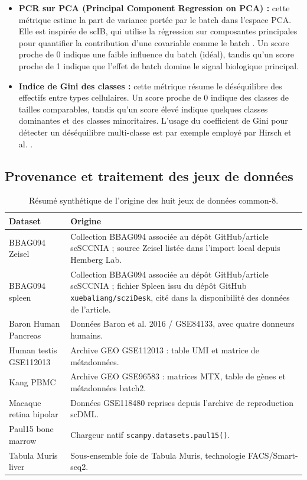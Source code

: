 \begin{itemize}
    \item \textbf{PCR sur PCA (Principal Component Regression on PCA) :} cette métrique estime la part de variance portée par le batch dans l'espace PCA. Elle est inspirée de scIB, qui utilise la régression sur composantes principales pour quantifier la contribution d'une covariable comme le batch \cite{luecken_benchmarking_2022}. Un score proche de 0 indique une faible influence du batch (idéal), tandis qu'un score proche de 1 indique que l'effet de batch domine le signal biologique principal.
    \item \textbf{Indice de Gini des classes :} cette métrique résume le déséquilibre des effectifs entre types cellulaires. Un score proche de 0 indique des classes de tailles comparables, tandis qu'un score élevé indique quelques classes dominantes et des classes minoritaires. L'usage du coefficient de Gini pour détecter un déséquilibre multi-classe est par exemple employé par Hirsch et al. \cite{hirsch2023exploiting}.
\end{itemize}

\subsection*{Provenance et traitement des jeux de données}

\begin{table}[H]
\centering
\footnotesize
\setlength{\tabcolsep}{4pt}
\begin{tabularx}{\textwidth}{p{} X}
\toprule
\textbf{Dataset} & \textbf{Origine} \\
\midrule
BBAG094 Zeisel & Collection BBAG094 associée au dépôt GitHub/article scSCCNIA \cite{wang_scsccnia_2026}; source Zeisel listée dans l'import local depuis Hemberg Lab. \\
BBAG094 spleen & Collection BBAG094 associée au dépôt GitHub/article scSCCNIA \cite{wang_scsccnia_2026}; fichier Spleen issu du dépôt GitHub \texttt{xuebaliang/scziDesk}, cité dans la disponibilité des données de l'article. \\
Baron Human Pancreas & Données Baron et al. 2016 / GSE84133, avec quatre donneurs humains. \\
Human testis GSE112013 & Archive GEO GSE112013 : table UMI et matrice de métadonnées. \\
Kang PBMC & Archive GEO GSE96583 : matrices MTX, table de gènes et métadonnées batch2. \\
Macaque retina bipolar & Données GSE118480 reprises depuis l'archive de reproduction scDML. \\
Paul15 bone marrow & Chargeur natif \texttt{scanpy.datasets.paul15()}. \\
Tabula Muris liver & Sous-ensemble foie de Tabula Muris, technologie FACS/Smart-seq2. \\
\bottomrule
\end{tabularx}
\caption{Résumé synthétique de l'origine des huit jeux de données common-8.}
\label{tab:datasets_provenance}
\end{table}

